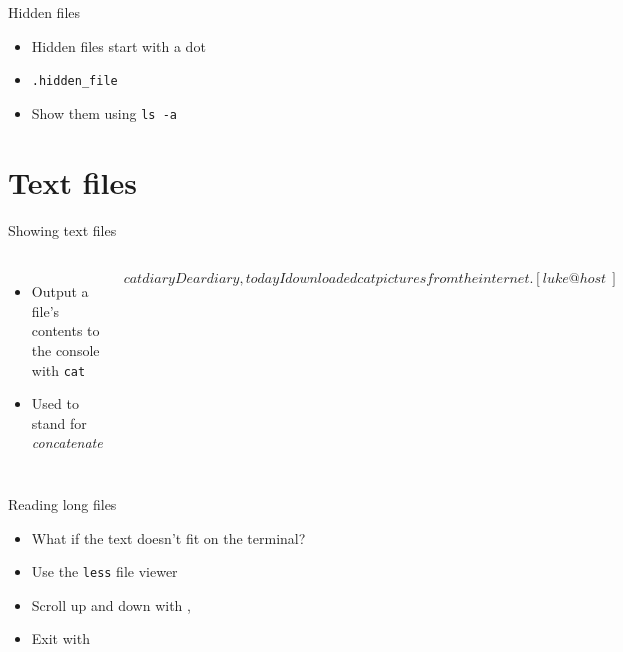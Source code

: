     \begin{frame}[t,fragile]{Hidden files}
        \begin{itemize}
            \item{Hidden files start with a dot}
            \item{\texttt{.hidden\_file}}
            \item{Show them using \texttt{ls -a}}
        \end{itemize}
    \end{frame}

    \section{Text files}

    \begin{frame}[t,fragile]{Showing text files}
        \begin{columns}[T]
            \begin{itemize}
                \item Output a file's contents to the console with
                    \texttt{cat}
                \item Used to stand for \emph{concatenate}
            \end{itemize}
            \begin{bashenv}$ cat diary
Dear diary, today I downloaded
cat pictures from the internet.
[luke@host ~]$
            \end{bashenv}
        \end{columns}
    \end{frame}

    \begin{frame}[t,fragile]{Reading long files}
        \begin{itemize}
            \item What if the text doesn't fit on the terminal?
            \item Use the \texttt{less} file viewer
            \item Scroll up and down with \keys{\arrowkeyup}, \keys{\arrowkeydown}
            \item Exit with 
        \end{itemize}
    \end{frame}

